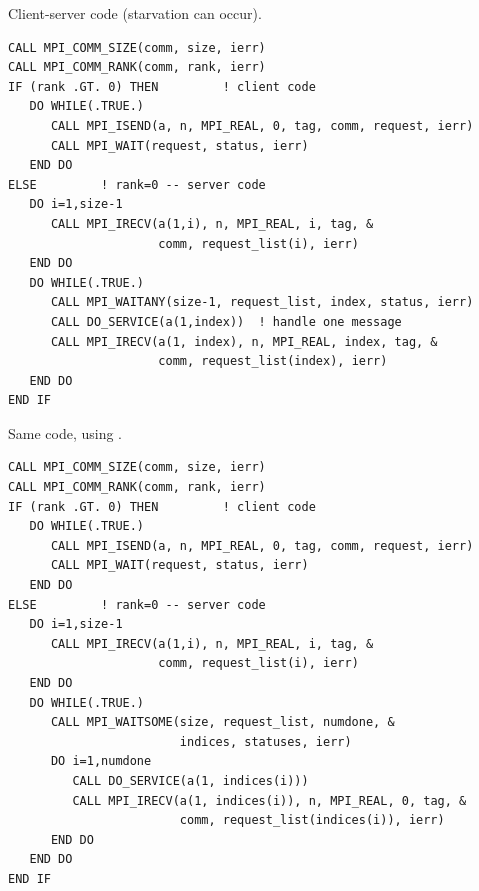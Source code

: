 \begin{example}
\label{pt2pt-exN}
%
%
Client-server code (starvation can occur).
\begin{lstlisting}[language={[MPI]Fortran}]
CALL MPI_COMM_SIZE(comm, size, ierr)
CALL MPI_COMM_RANK(comm, rank, ierr)
IF (rank .GT. 0) THEN         ! client code
   DO WHILE(.TRUE.)
      CALL MPI_ISEND(a, n, MPI_REAL, 0, tag, comm, request, ierr)
      CALL MPI_WAIT(request, status, ierr)
   END DO
ELSE         ! rank=0 -- server code
   DO i=1,size-1
      CALL MPI_IRECV(a(1,i), n, MPI_REAL, i, tag, &
                     comm, request_list(i), ierr)
   END DO
   DO WHILE(.TRUE.)
      CALL MPI_WAITANY(size-1, request_list, index, status, ierr)
      CALL DO_SERVICE(a(1,index))  ! handle one message
      CALL MPI_IRECV(a(1, index), n, MPI_REAL, index, tag, &
                     comm, request_list(index), ierr)
   END DO
END IF
\end{lstlisting}
\end{example}
\label{page:pt2pt-waitany}

\begin{example}
\label{pt2pt-exO}
%
%
Same code, using .
\begin{lstlisting}[language={[MPI]Fortran}]
CALL MPI_COMM_SIZE(comm, size, ierr)
CALL MPI_COMM_RANK(comm, rank, ierr)
IF (rank .GT. 0) THEN         ! client code
   DO WHILE(.TRUE.)
      CALL MPI_ISEND(a, n, MPI_REAL, 0, tag, comm, request, ierr)
      CALL MPI_WAIT(request, status, ierr)
   END DO
ELSE         ! rank=0 -- server code
   DO i=1,size-1
      CALL MPI_IRECV(a(1,i), n, MPI_REAL, i, tag, &
                     comm, request_list(i), ierr)
   END DO
   DO WHILE(.TRUE.)
      CALL MPI_WAITSOME(size, request_list, numdone, &
                        indices, statuses, ierr)
      DO i=1,numdone
         CALL DO_SERVICE(a(1, indices(i)))
         CALL MPI_IRECV(a(1, indices(i)), n, MPI_REAL, 0, tag, &
                        comm, request_list(indices(i)), ierr)
      END DO
   END DO
END IF
\end{lstlisting}
\end{example}



